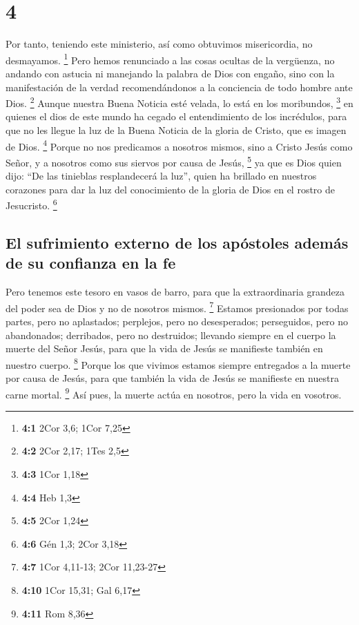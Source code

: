 \hypertarget{section-3}{%
\section{4}\label{section-3}}

 Por tanto, teniendo este ministerio, así como obtuvimos
misericordia, no desmayamos. \footnote{\textbf{4:1} 2Cor 3,6; 1Cor 7,25}
 Pero hemos renunciado a las cosas ocultas de la
vergüenza, no andando con astucia ni manejando la palabra de Dios con
engaño, sino con la manifestación de la verdad recomendándonos a la
conciencia de todo hombre ante Dios. \footnote{\textbf{4:2} 2Cor 2,17;
  1Tes 2,5}  Aunque nuestra Buena Noticia esté velada, lo
está en los moribundos, \footnote{\textbf{4:3} 1Cor 1,18} 
en quienes el dios de este mundo ha cegado el entendimiento de los
incrédulos, para que no les llegue la luz de la Buena Noticia de la
gloria de Cristo, que es imagen de Dios. \footnote{\textbf{4:4} Heb 1,3}
 Porque no nos predicamos a nosotros mismos, sino a Cristo
Jesús como Señor, y a nosotros como sus siervos por causa de Jesús,
\footnote{\textbf{4:5} 2Cor 1,24}  ya que es Dios quien
dijo: ``De las tinieblas resplandecerá la luz'', quien ha brillado en
nuestros corazones para dar la luz del conocimiento de la gloria de Dios
en el rostro de Jesucristo. \footnote{\textbf{4:6} Gén 1,3; 2Cor 3,18}

\hypertarget{el-sufrimiento-externo-de-los-apuxf3stoles-ademuxe1s-de-su-confianza-en-la-fe}{%
\subsection{El sufrimiento externo de los apóstoles además de su
confianza en la
fe}\label{el-sufrimiento-externo-de-los-apuxf3stoles-ademuxe1s-de-su-confianza-en-la-fe}}

 Pero tenemos este tesoro en vasos de barro, para que la
extraordinaria grandeza del poder sea de Dios y no de nosotros mismos.
\footnote{\textbf{4:7} 1Cor 4,11-13; 2Cor 11,23-27} 
Estamos presionados por todas partes, pero no aplastados; perplejos,
pero no desesperados;  perseguidos, pero no abandonados;
derribados, pero no destruidos;  llevando siempre en el
cuerpo la muerte del Señor Jesús, para que la vida de Jesús se
manifieste también en nuestro cuerpo. \footnote{\textbf{4:10} 1Cor
  15,31; Gal 6,17}  Porque los que vivimos estamos
siempre entregados a la muerte por causa de Jesús, para que también la
vida de Jesús se manifieste en nuestra carne mortal. \footnote{\textbf{4:11}
  Rom 8,36}  Así pues, la muerte actúa en nosotros, pero
la vida en vosotros.

